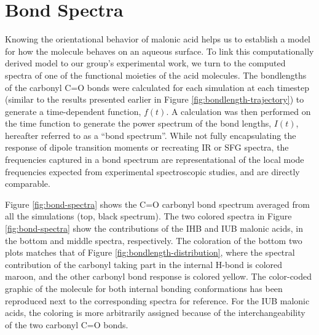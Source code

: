 \section {Bond Spectra}

Knowing the orientational behavior of malonic acid helps us to establish a model for how the molecule behaves on an aqueous surface. To link this computationally derived model to our group's experimental work, we turn to the computed spectra of one of the functional moieties of the acid molecules. The bondlengths of the carbonyl C=O bonds were calculated for each simulation at each timestep (similar to the results presented earlier in Figure \ref{fig:bondlength-trajectory}) to generate a time-dependent function, $f(t)$. A calculation was then performed on the time function to generate the power spectrum of the bond lengths, $I(t)$, hereafter referred to as a ``bond spectrum''. While not fully encapsulating the response of dipole transition moments or recreating IR or SFG spectra, the frequencies captured in a bond spectrum are representational of the local mode frequencies expected from experimental spectroscopic studies, and are directly comparable.

Figure \ref{fig:bond-spectra} shows the C=O carbonyl bond spectrum averaged from all the simulations (top, black spectrum). The two colored spectra in Figure \ref{fig:bond-spectra} show the contributions of the IHB and IUB malonic acids, in the bottom and middle spectra, respectively. The coloration of the bottom two plots matches that of Figure \ref{fig:bondlength-distribution}, where the spectral contribution of the carbonyl taking part in the internal H-bond is colored maroon, and the other carbonyl bond response is colored yellow. The color-coded graphic of the molecule for both internal bonding conformations has been reproduced next to the corresponding spectra for reference. For the IUB malonic acids, the coloring is more arbitrarily assigned because of the interchangeability of the two carbonyl C=O bonds.


